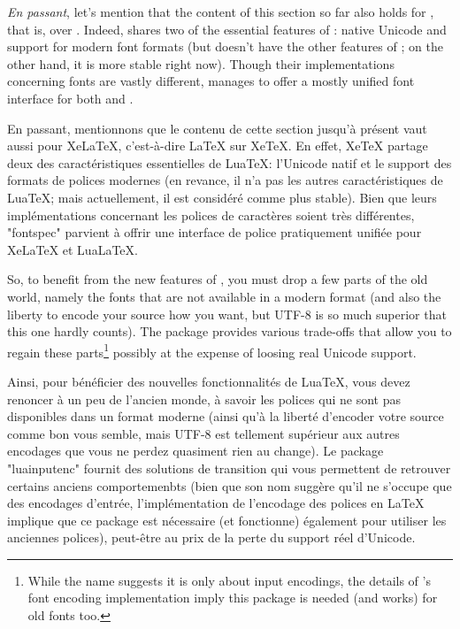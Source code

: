 \documentclass{lltxdoc}
\begin{document}
\emph{En passant}, let's mention that the content of this section so far also
holds for \xelatex, that is, \latex over \xetex. Indeed, \xetex shares two of
the essential features of \luatex: native Unicode and support for modern font
formats (but doesn't have the other features of \luatex; on the other hand, it
is more stable right now). Though their implementations concerning fonts are
vastly different,  manages to offer a mostly unified font
interface for both \xelatex and \lualatex.

En passant, mentionnons que le contenu de cette section jusqu'à présent vaut aussi pour XeLaTeX, c'est-à-dire LaTeX sur XeTeX. En effet, XeTeX partage deux des caractéristiques essentielles de LuaTeX: l'Unicode natif et le support des formats de polices modernes (en revance, il n'a pas les autres caractéristiques de LuaTeX; mais actuellement, il est considéré comme plus stable). Bien que leurs implémentations concernant les polices de caractères soient très différentes, "fontspec" parvient à offrir une interface de police pratiquement unifiée pour XeLaTeX et LuaLaTeX.

\medskip

So, to benefit from the new features of \luatex, you must drop a few parts of
the old world, namely the fonts that are not available in a modern format (and
also the liberty to encode your source how you want, but UTF-8 is so much
superior that this one hardly counts). The package  provides
various trade-offs that allow you to regain these parts\footnote{While the
  name suggests it is only about input encodings, the details of \latex's font
  encoding implementation imply this package is needed (and works) for old
  fonts too.} possibly at the expense of loosing real Unicode support.

Ainsi, pour bénéficier des nouvelles fonctionnalités de LuaTeX, vous devez renoncer à un peu de l'ancien monde, à savoir les polices qui ne sont pas disponibles dans un format moderne (ainsi qu'à la liberté d'encoder votre source comme bon vous semble, mais UTF-8 est tellement supérieur aux autres encodages que vous ne perdez quasiment rien au change). Le package "luainputenc" fournit des solutions de transition qui vous permettent de retrouver certains anciens comportemenbts (bien que son nom suggère qu'il ne s'occupe que des encodages d'entrée, l'implémentation de l'encodage des polices en LaTeX implique que ce package est nécessaire (et fonctionne) également pour utiliser les anciennes polices), peut-être au prix de la perte du support réel d'Unicode.
\end{document}
